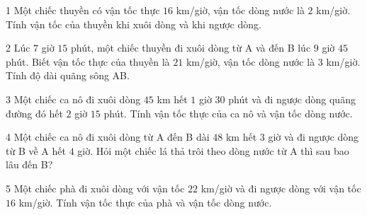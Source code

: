 \begin{probbox}{1}{\relax}
Một chiếc thuyền có vận tốc thực $16$ km/giờ, vận tốc dòng nước là $2$ km/giờ. Tính vận tốc của thuyền khi xuôi dòng và khi ngược dòng.
\end{probbox}
\gap
\begin{probbox}{2}{\relax}
Lúc $7$ giờ $15$ phút, một chiếc thuyền đi xuôi dòng từ A và đến B lúc $9$ giờ $45$ phút. Biết vận tốc thực của thuyền là $21$ km/giờ, vận tốc dòng nước là $3$ km/giờ. Tính độ dài quãng sông AB.
\end{probbox}
\gap
\begin{probbox}{3}{\relax}
Một chiếc ca nô đi xuôi dòng $45$ km hết $1$ giờ $30$ phút và đi ngược dòng quãng đường đó hết $2$ giờ $15$ phút. Tính vận tốc thực của ca nô và vận tốc dòng nước.
\end{probbox}
\gap
\begin{probbox}{4}{\relax}
Một chiếc ca nô đi xuôi dòng từ A đến B dài $48$ km hết $3$ giờ và đi ngược dòng từ B về A hết $4$ giờ. Hỏi một chiếc lá thả trôi theo dòng nước từ A thì sau bao lâu đến B?
\end{probbox}
\gap
\begin{probbox}{5}{\relax}
Một chiếc phà đi xuôi dòng với vận tốc $22$ km/giờ và đi ngược dòng với vận tốc $16$ km/giờ. Tính vận tốc thực của phà và vận tốc dòng nước.
\end{probbox}
